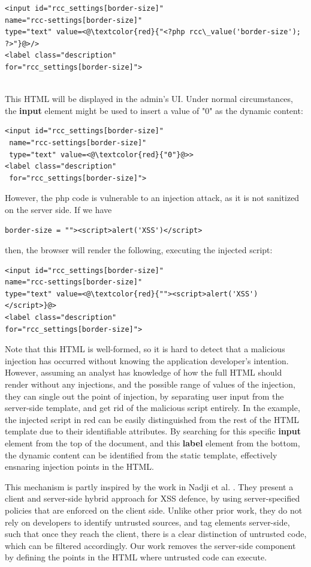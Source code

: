 \begin{lstlisting}
<input id="rcc_settings[border-size]" 
name="rcc-settings[border-size]" 
type="text" value=<@\textcolor{red}{"<?php rcc\_value('border-size'); ?>"}@>/>
<label class="description"
for="rcc_settings[border-size]">
\end{lstlisting}
\
\\
This HTML will be displayed in the admin's UI. Under normal circumstances, the \textbf{input} element might be used to insert a value of "0" as the dynamic content:
\\
\begin{lstlisting}
<input id="rcc_settings[border-size]" 
 name="rcc-settings[border-size]" 
 type="text" value=<@\textcolor{red}{"0"}@>>
<label class="description"
 for="rcc_settings[border-size]">
\end{lstlisting}
However, the php code is vulnerable to an injection attack, as it is not sanitized on the server side. If we have
\begin{lstlisting}
border-size = ""><script>alert('XSS')</script>
\end{lstlisting}
then, the browser will render the following, executing the injected script:
\begin{lstlisting}
<input id="rcc_settings[border-size]" 
name="rcc-settings[border-size]" 
type="text" value=<@\textcolor{red}{""><script>alert('XSS')</script>}@>
<label class="description"
for="rcc_settings[border-size]">
\end{lstlisting}

Note that this HTML is well-formed, so it is hard to detect that a malicious injection has occurred without knowing the application developer's intention. However, assuming an analyst has knowledge of how the full HTML should render without any injections, and the possible range of values of the injection, they can single out the point of injection, by separating user input from the server-side template, and get rid of the malicious script entirely. In the example, the injected script in red can be easily distinguished from the rest of the HTML template due to their identifiable attributes. By searching for this specific \textbf{input} element from the top of the document, and this \textbf{label} element from the bottom, the dynamic content can be identified from the static template, effectively ensnaring injection points in the HTML. 

This mechanism is partly inspired by the work in Nadji et al. \cite{Nadji:2009}. They present a client and server-side hybrid approach for XSS defence, by using server-specified policies that are enforced on the client side. Unlike other prior work, they do not rely on developers to identify untrusted sources, and tag elements server-side, such that once they reach the client, there is a clear distinction of untrusted code, which can be filtered accordingly. Our work removes the server-side component by defining the points in the HTML where untrusted code can execute.

